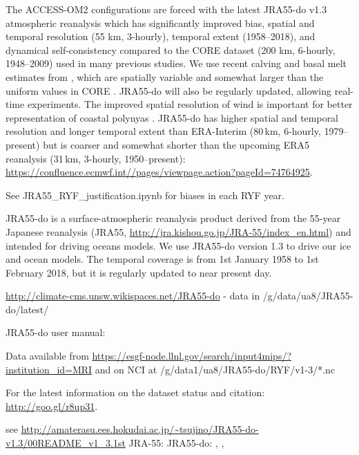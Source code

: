\documentclass[11pt]{article}
\begin{document}
The ACCESS-OM2 configurations are forced with the latest JRA55-do v1.3 atmospheric reanalysis \citep{TsujinoETAL2018a} which has significantly improved bias, spatial and temporal resolution (55 km, 3-hourly), temporal extent (1958--2018), and dynamical self-consistency compared to the CORE dataset (200 km, 6-hourly, 1948--2009) used in many previous studies. We use recent calving and basal melt estimates from \citet{DepoorterBamberGriggsLenaertsLigtenbergBroekeMoholdt2013a}, which are spatially variable and somewhat larger than the uniform values in CORE \citep{TsujinoETAL2018a}. JRA55-do will also be regularly updated, allowing real-time experiments. The improved spatial resolution of wind is important for better representation of coastal polynyas \citep{StosselZhangVihma2011a, ZhangVihmaStosselUotila2015a}.
JRA55-do has higher spatial and temporal resolution and longer temporal extent than ERA-Interim (80\,km, 6-hourly, 1979--present) %
but is coarser and somewhat shorter than the upcoming ERA5 reanalysis (31\,km, 3-hourly, 1950--present): \url{https://confluence.ecmwf.int//pages/viewpage.action?pageId=74764925}.%


See JRA55_RYF_justification.ipynb for biases in each RYF year.

JRA55-do \citep{TsujinoETAL2018a} is a surface-atmospheric reanalysis product derived from the 55-year Japanese reanalysis (JRA55, \url{http://jra.kishou.go.jp/JRA-55/index_en.html}) and intended for driving oceans models. 
We use JRA55-do version 1.3 to drive our ice and ocean models.
The temporal coverage is from 1st January 1958 to 1st February 2018, but it is regularly updated to near present day.



\url{http://climate-cms.unsw.wikispaces.net/JRA55-do} - data in /g/data/ua8/JRA55-do/latest/

JRA55-do user manual: \citet{TsujinoUrakawaNakanoSmallKimYeagerDanabasogluSuzukiBamber2018a}

Data available from \url{https://esgf-node.llnl.gov/search/input4mips/?institution_id=MRI}
and on NCI at /g/data1/ua8/JRA55-do/RYF/v1-3/*.nc

For the latest information on the dataset status and citation: \url{http://goo.gl/r8up31}.

see \url{http://amaterasu.ees.hokudai.ac.jp/~tsujino/JRA55-do-v1.3/00README_v1_3.1st}
JRA-55: \citet{KobayashiOtaHaradaEbitaMoriyaOnodaOnogiKamahoriKobayashi2015a}
JRA55-do: \citet{Tsujino2015a, Tsujino2015b, Tsujino2016a, TsujinoETAL2018a}, \citet{TsujinoUrakawaSuzukiKomuroSmallKimYeagerDanabasogluGriffies2016a},
\citet{KimSmallYeagerDanabasogluTsujinoETAL2018a}
\end{document}
